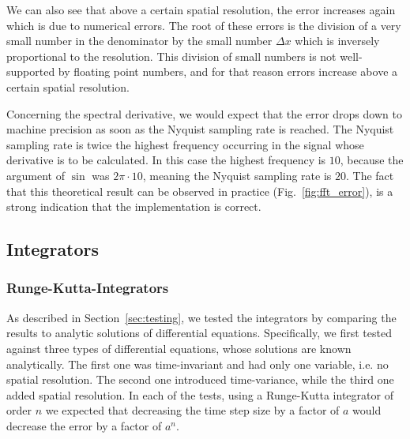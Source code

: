 We can also see that above a certain spatial resolution, the error increases again which is due to numerical errors.
The root of these errors is the division of a very small number in the denominator by the small number $\Delta x$ which is inversely proportional to the resolution.
This division of small numbers is not well-supported by floating point numbers, and for that reason errors increase above a certain spatial resolution.

Concerning the spectral derivative, we would expect that the error drops down to machine precision as soon as the Nyquist sampling rate is reached.
The Nyquist sampling rate is twice the highest frequency occurring in the signal whose derivative is to be calculated.
In this case the highest frequency is $10$, because the argument of $\sin$ was $2\pi\cdot 10$, meaning the Nyquist sampling rate is $20$.
The fact that this theoretical result can be observed in practice (Fig.~\ref{fig:fft_error}), is a strong indication that the implementation is correct.


\FloatBarrier


\subsection{Integrators}
\subsubsection{Runge-Kutta-Integrators}
As described in Section~\ref{sec:testing}, we tested the integrators by comparing the results to analytic solutions of differential equations.
Specifically, we first tested against three types of differential equations, whose solutions are known analytically.
The first one was time-invariant and had only one variable, i.e. no spatial resolution.
The second one introduced time-variance, while the third one added spatial resolution.
In each of the tests, using a Runge-Kutta integrator of order $n$ we expected that decreasing the time step size by a factor of $a$ would decrease the error by a factor of $a^n$.

